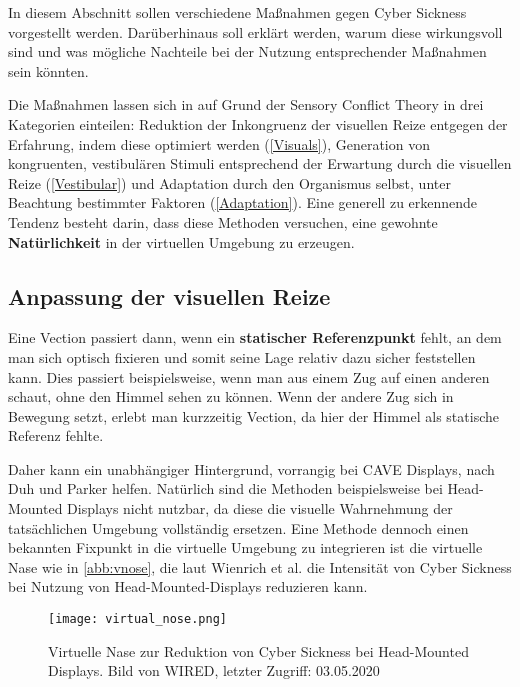In diesem Abschnitt sollen verschiedene Ma{\ss}nahmen gegen Cyber Sickness vorgestellt werden. Dar\"uberhinaus soll erkl\"art werden, warum diese wirkungsvoll sind und was m\"ogliche Nachteile bei der Nutzung entsprechender Ma{\ss}nahmen sein k\"onnten.

Die Ma{\ss}nahmen lassen sich in auf Grund der Sensory Conflict Theory in drei Kategorien einteilen: 
Reduktion der Inkongruenz der visuellen Reize entgegen der Erfahrung, indem diese optimiert werden (\autoref{Visuals}), Generation von kongruenten, vestibul\"aren Stimuli entsprechend der Erwartung durch die visuellen Reize (\autoref{Vestibular}) und Adaptation durch den Organismus selbst, unter Beachtung bestimmter Faktoren (\autoref{Adaptation}). Eine generell zu erkennende Tendenz besteht darin, dass diese Methoden versuchen, eine gewohnte \textbf{Nat\"urlichkeit} in der virtuellen Umgebung zu erzeugen.

\subsection{Anpassung der visuellen Reize}\label{Visuals}

Eine Vection passiert dann, wenn ein \textbf{statischer Referenzpunkt} fehlt, an dem man sich optisch fixieren und somit seine Lage relativ dazu sicher feststellen kann. Dies passiert beispielsweise, wenn man aus einem Zug auf einen anderen schaut, ohne den Himmel sehen zu k\"onnen. Wenn der andere Zug sich in Bewegung setzt, erlebt man kurzzeitig Vection, da hier der Himmel als statische Referenz fehlte.

Daher kann ein unabh\"angiger Hintergrund, vorrangig bei CAVE Displays, nach Duh und Parker \cite{Duh:2001:Static} helfen. Nat\"urlich sind die Methoden beispielsweise bei Head-Mounted Displays nicht nutzbar, da diese die visuelle Wahrnehmung der tats\"achlichen Umgebung vollst\"andig ersetzen. Eine Methode dennoch einen bekannten Fixpunkt in die virtuelle Umgebung zu integrieren ist die virtuelle Nase wie in \autoref{abb:vnose}, die laut Wienrich et al.\cite{Wienrich:2018:Nose} die Intensit\"at von Cyber Sickness bei Nutzung von Head-Mounted-Displays reduzieren kann.

\begin{figure}[t]
	\centering 
	\texttt{[image: virtual\_nose.png]}
	\caption{Virtuelle Nase zur Reduktion von Cyber Sickness bei Head-Mounted Displays. Bild von WIRED\cite{WIRED:2020:Nose}, letzter Zugriff: 03.05.2020}
	\label{abb:vnose}
\end{figure}

